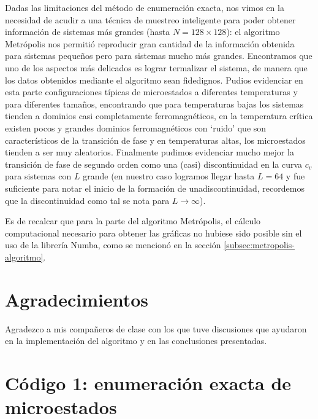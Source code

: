 \documentclass[%
 reprint,
 amsmath,amssymb,
 aps,
 pra,
]{revtex4-2}
\begin{document}
Dadas las limitaciones del método de enumeración exacta, nos vimos en la necesidad de acudir a una técnica de muestreo inteligente para poder obtener información de sistemas más grandes (hasta $N=128 \times 128$): el algoritmo Metrópolis nos permitió reproducir gran cantidad de la información obtenida para sistemas pequeños pero para sistemas mucho más grandes. Encontramos que uno de los aspectos más delicados es lograr termalizar el sistema, de manera que los datos obtenidos mediante el algoritmo sean fidedignos. Pudios evidenciar en esta parte configuraciones típicas de microestados a diferentes temperaturas y para diferentes tamaños, encontrando que para temperaturas bajas los sistemas tienden a dominios casi completamente ferromagnéticos, en la temperatura crítica existen pocos y grandes dominios ferromagnéticos con `ruido' que son característicos de la transición de fase y en temperaturas altas, los microestados tienden a ser muy aleatorios. Finalmente pudimos evidenciar mucho mejor la transición de fase de segundo orden como una (casi) discontinuidad en la curva $c_v$ para sistemas con $L$ grande (en nuestro caso logramos llegar hasta $L=64$ y fue suficiente para notar el inicio de la formación de unadiscontinuidad, recordemos que la discontinuidad como tal se nota para $L\rightarrow\infty$).

Es de recalcar que para la parte del algoritmo Metrópolis, el cálculo computacional necesario para obtener las gráficas no hubiese sido posible sin el uso de la librería Numba, como se mencionó en la sección \ref{subsec:metropolis-algoritmo}.

\section*{Agradecimientos}
Agradezco a mis compañeros de clase con los que tuve discusiones que ayudaron en la implementación del algoritmo y en las conclusiones presentadas.

\nocite{*}




\newpage


\appendix


\section{Código 1: enumeración exacta de microestados\label{appx:microestados}}
\end{document}
